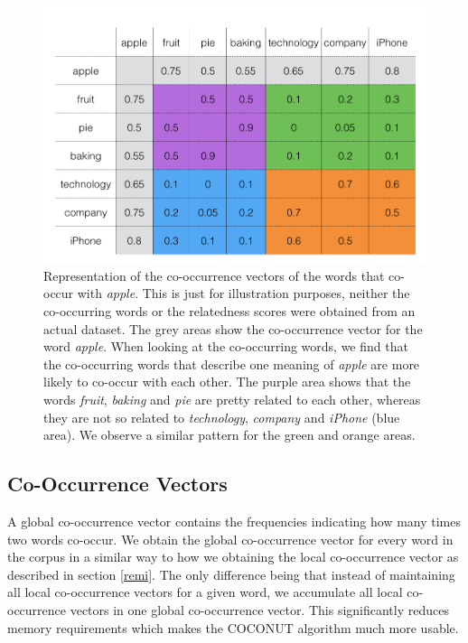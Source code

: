 \documentclass[11pt]{article}
\begin{document}
\begin{figure}
\center
	\includegraphics[scale=0.20]{cococ.png}
\caption{Representation of the co-occurrence vectors of the words that co-occur with \textit{apple}. This is just for illustration purposes, neither the co-occurring words or the relatedness scores were obtained from an actual dataset. The grey areas show the co-occurrence vector for the word \textit{apple}. When looking at the co-occurring words, we find that the co-occurring words that describe one meaning of \textit{apple} are more likely to co-occur with each other. The purple area shows that the words \textit{fruit}, \textit{baking} and \textit{pie} are pretty related to each other, whereas they are not so related to \textit{technology}, \textit{company} and \textit{iPhone} (blue area). We observe a similar pattern for the green and orange areas.}
\label{cococ}
\end{figure}

\subsection{Co-Occurrence Vectors}
A global co-occurrence vector contains the frequencies indicating how many times two words co-occur. We obtain the global co-occurrence vector for every word in the corpus in a similar way to how we obtaining the local co-occurrence vector as described in section \ref{remi}. The only difference being that instead of maintaining all local co-occurrence vectors for a given word, we accumulate all local co-occurrence vectors in one global co-occurrence vector. This significantly reduces memory requirements which makes the COCONUT algorithm much more usable. 
\end{document}
